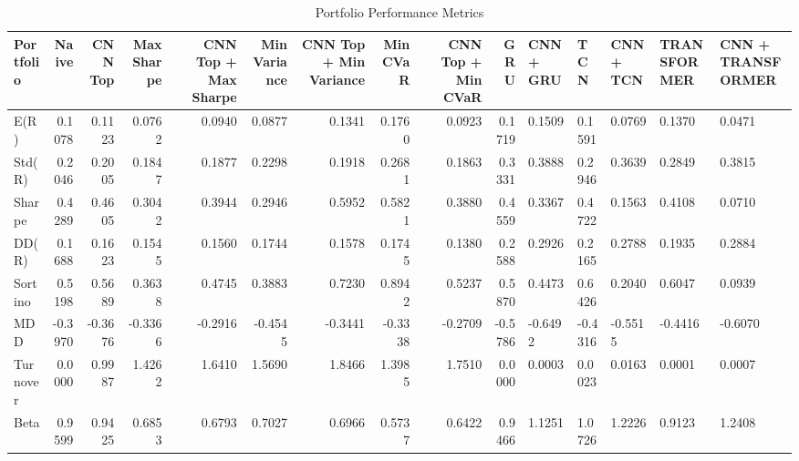 \begin{table}[htbp]
\centering
\caption{Portfolio Performance Metrics}
\begin{tabular}{lrrrrrrrrr}
\hline
Portfolio & Naive & CNN Top & Max Sharpe & CNN Top + Max Sharpe & Min Variance & CNN Top + Min Variance & Min CVaR & CNN Top + Min CVaR & GRU & CNN + GRU & TCN & CNN + TCN & TRANSFORMER & CNN + TRANSFORMER \\
\hline
E(R) & 0.1078 & 0.1123 & 0.0762 & 0.0940 & 0.0877 & 0.1341 & 0.1760 & 0.0923 & 0.1719 & 0.1509 & 0.1591 & 0.0769 & 0.1370 & 0.0471 \\
Std(R) & 0.2046 & 0.2005 & 0.1847 & 0.1877 & 0.2298 & 0.1918 & 0.2681 & 0.1863 & 0.3331 & 0.3888 & 0.2946 & 0.3639 & 0.2849 & 0.3815 \\
Sharpe & 0.4289 & 0.4605 & 0.3042 & 0.3944 & 0.2946 & 0.5952 & 0.5821 & 0.3880 & 0.4559 & 0.3367 & 0.4722 & 0.1563 & 0.4108 & 0.0710 \\
DD(R) & 0.1688 & 0.1623 & 0.1545 & 0.1560 & 0.1744 & 0.1578 & 0.1745 & 0.1380 & 0.2588 & 0.2926 & 0.2165 & 0.2788 & 0.1935 & 0.2884 \\
Sortino & 0.5198 & 0.5689 & 0.3638 & 0.4745 & 0.3883 & 0.7230 & 0.8942 & 0.5237 & 0.5870 & 0.4473 & 0.6426 & 0.2040 & 0.6047 & 0.0939 \\
MDD & -0.3970 & -0.3676 & -0.3366 & -0.2916 & -0.4545 & -0.3441 & -0.3338 & -0.2709 & -0.5786 & -0.6492 & -0.4316 & -0.5515 & -0.4416 & -0.6070 \\
Turnover & 0.0000 & 0.9987 & 1.4262 & 1.6410 & 1.5690 & 1.8466 & 1.3985 & 1.7510 & 0.0000 & 0.0003 & 0.0023 & 0.0163 & 0.0001 & 0.0007 \\
Beta & 0.9599 & 0.9425 & 0.6853 & 0.6793 & 0.7027 & 0.6966 & 0.5737 & 0.6422 & 0.9466 & 1.1251 & 1.0726 & 1.2226 & 0.9123 & 1.2408 \\
\hline
\end{tabular}
\end{table}